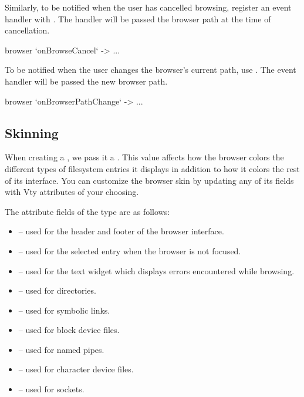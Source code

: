 Similarly, to be notified when the user has cancelled browsing,
register an event handler with .  The handler will
be passed the browser path at the time of cancellation.

\begin{haskellcode}
 browser `onBrowseCancel` \path -> ...
\end{haskellcode}

To be notified when the user changes the browser's current path, use
.  The event handler will be passed the
new browser path.

\begin{haskellcode}
 browser `onBrowserPathChange` \path -> ...
\end{haskellcode}

\subsection{Skinning}

When creating a , we pass it a .  This
value affects how the browser colors the different types of filesystem
entries it displays in addition to how it colors the rest of its
interface.  You can customize the browser skin by updating any of its
fields with Vty attributes of your choosing.


The attribute fields of the  type are as follows:

\begin{itemize}
\item {} -- used for the header and footer of the
  browser interface.
\item {} -- used for the selected entry when
  the browser is not focused.
\item {} -- used for the text widget which displays
  errors encountered while browsing.
\item {} -- used for directories.
\item {} -- used for symbolic links.
\item {} -- used for block device files.
\item {} -- used for named pipes.
\item {} -- used for character device files.
\item {} -- used for sockets.
\end{itemize}

